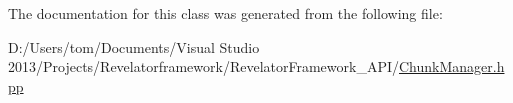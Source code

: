 The documentation for this class was generated from the following file\-:\begin{DoxyCompactItemize}
\item 
D\-:/\-Users/tom/\-Documents/\-Visual Studio 2013/\-Projects/\-Revelatorframework/\-Revelator\-Framework\-\_\-\-A\-P\-I/\hyperlink{_chunk_manager_8hpp}{Chunk\-Manager.\-hpp}\end{DoxyCompactItemize}
